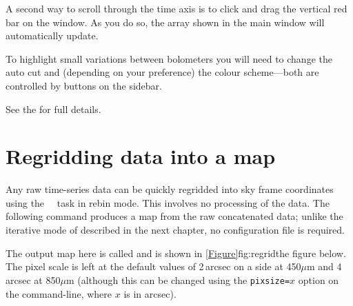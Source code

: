 \documentclass[11pt,oneside,chapters]{starlink}
\begin{document}

A second way to scroll through the time axis is to click and drag the
vertical red bar on the  window. As you do
so, the array shown in the main window will automatically update.

To highlight small variations between bolometers you will need to change
the auto cut and (depending on your preference) the
colour scheme---both are controlled by buttons on the sidebar.

See the  for full
details.

\section{Regridding data into a map}
\label{sec:regrid}

Any raw time-series data can be quickly regridded into sky frame
coordinates using the \smurf\ \makemap\ task in rebin mode. This
involves no processing of the data. The following command produces a
map from the raw concatenated data; unlike the iterative mode of
 described in the next chapter, no configuration file is
required.

\begin{terminalv}
\end{terminalv}

The output map here is called  and is shown
in \cref{Figure}{fig:regrid}{the figure below}.
The pixel scale is left at the default values of 2\,arcsec on a side at
450$\mu$m and 4\,arcsec at 850$\mu$m (although this can be changed
using the \texttt{pixsize=}$x$ option on the command-line, where $x$ is in
arcsec).

\end{document}
